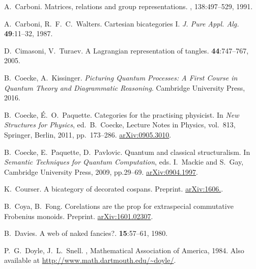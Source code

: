 \begin{thebibliography}{RSW00}
    A.\ Carboni.
    \newblock Matrices, relations and group representations.
    , 138:497--529, 1991.

    A.\ Carboni, R.\ F.\ C.\ Walters.
    \newblock Cartesian bicategories I.
    \newblock \textsl{J. Pure Appl. Alg.} {\bf 49}:11--32, 1987. 

    D.\ Cimasoni, V.\ Turaev.
    \newblock A Lagrangian representation of tangles.
     {\bf 44}:747--767, 2005.

    B.\ Coecke, A.\ Kissinger.
    \newblock \textsl{Picturing Quantum Processes: A First Course in Quantum Theory and Diagrammatic Reasoning}.
    \newblock Cambridge University Press, 2016.

    B.\ Coecke, \'E.\ O.\ Paquette.
    \newblock Categories for the practising physicist.
    \newblock In {\sl New Structures for Physics}, ed.\ B.\ Coecke,  
    Lecture Notes in Physics, vol.\ 813, Springer, Berlin, 2011, pp.\ 173--286.
    \newblock \href{http://arxiv.org/abs/0905.3010}{arXiv:0905.3010}.

    B.\ Coecke, E.\ Paquette, D.\ Pavlovic.
    \newblock Quantum and classical structuralism.
    \newblock In \textsl{Semantic Techniques for Quantum
    Computation}, eds. I.\ Mackie and S.\ Gay, Cambridge University Press, 2009,
    pp.29--69.
    \newblock \href{http://arxiv.org/abs/0904.1997}{arXiv:0904.1997}.

    K.\ Courser.
    \newblock A bicategory of decorated cospans.
    \newblock Preprint. 
    \newblock \href{http://arxiv.org/abs/1606.}{arXiv:1606.}.

    B.\ Coya, B.\ Fong.
    \newblock Corelations are the prop for extraspecial commutative Frobenius
    monoids.
    \newblock Preprint.
    \newblock \href{http://arxiv.org/abs/1601.02307}{arXiv:1601.02307}.

    B.\ Davies.
    \newblock A web of naked fancies?.
     {\bf 15}:57--61, 1980.

    P.\ G.\ Doyle, J.\ L.\ Snell.
    , Mathematical Association of America, 1984.
    \newblock Also available at \href{http://www.math.dartmouth.edu/~doyle/}
    {http://www.math.dartmouth.edu/\~{}doyle/}.


\end{thebibliography}
